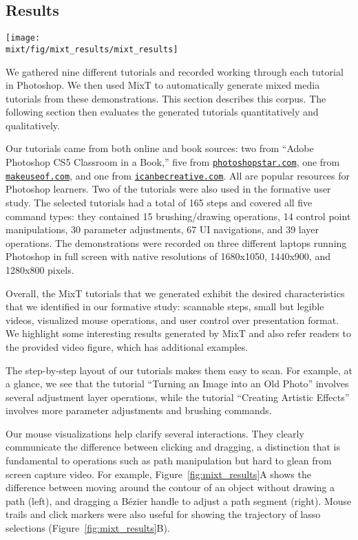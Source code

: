 \subsection{Results}

\begin{figure*}[!t]
  \centering
  \texttt{[image: \\mixt/fig/mixt\_results/mixt\_results]}
  \caption{Automatically-generated MixT results.}
  \label{fig:mixt_results}
\end{figure*}

We gathered nine different tutorials and recorded working through each tutorial in Photoshop. We then used MixT to automatically generate mixed media tutorials from these demonstrations. This section describes this corpus. The following section then evaluates the generated tutorials quantitatively and qualitatively.

Our tutorials came from both online and book sources: two from ``Adobe Photoshop CS5 Classroom in a Book,'' five from \texttt{\url{photoshopstar.com}}, one from \texttt{\url{makeuseof.com}}, and one from \texttt{\url{icanbecreative.com}}. All are popular resources for Photoshop learners. Two of the tutorials were also used in the formative user study. The selected tutorials had a total of 165 steps and covered all five command types: they contained 15 brushing/drawing operations, 14 control point manipulations, 30 parameter adjustments, 67 UI navigations, and 39 layer operations. The demonstrations were recorded on three different laptops running Photoshop in full screen with native resolutions of 1680x1050, 1440x900, and 1280x800 pixels.

Overall, the MixT tutorials that we generated exhibit the desired characteristics that we identified in our formative study: scannable steps, small but legible videos, visualized mouse operations, and user control over presentation format. We highlight some interesting results generated by MixT and also refer readers to the provided video figure, which has additional examples.

 The step-by-step layout of our tutorials makes them easy to scan. For example, at a glance, we see that the tutorial ``Turning an Image into an Old Photo'' involves several adjustment layer operations, while the tutorial ``Creating Artistic Effects'' involves more parameter adjustments and brushing commands.

 Our mouse visualizations help clarify several interactions. They clearly communicate the difference between clicking and dragging, a distinction that is fundamental to operations such as path manipulation but hard to glean from screen capture video. For example, Figure~\ref{fig:mixt_results}A shows the difference between moving around the contour of an object without drawing a path (left), and dragging a Bézier handle to adjust a path segment (right). Mouse trails and click markers were also useful for showing the trajectory of lasso selections (Figure~\ref{fig:mixt_results}B).


